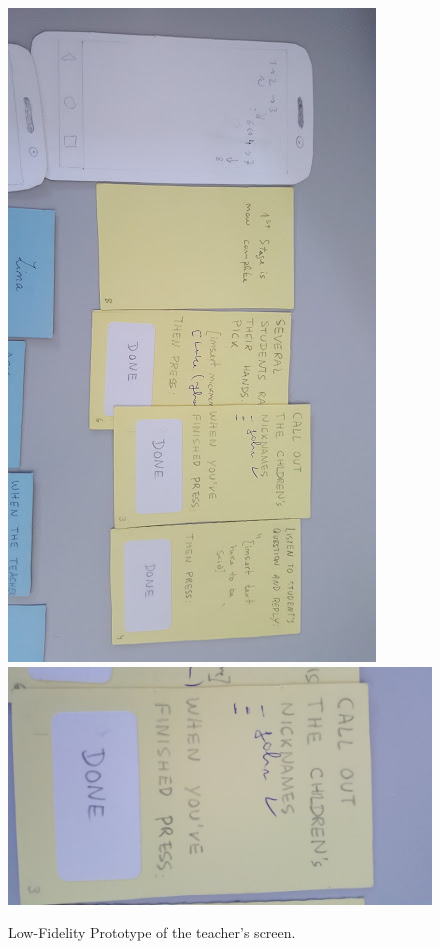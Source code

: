 \documentclass[runningheads]{llncs}
\begin{document}
\begin{figure}
    \centering
    \includegraphics[scale = 0.38, angle = 90]{paper_proto1.jpg}
    \includegraphics[scale = 0.12, angle = 90]{paper_proto3.jpg}
    \caption{Low-Fidelity Prototype of the teacher's screen.}
    \label{fig:LFPt}
\end{figure}
\end{document}
